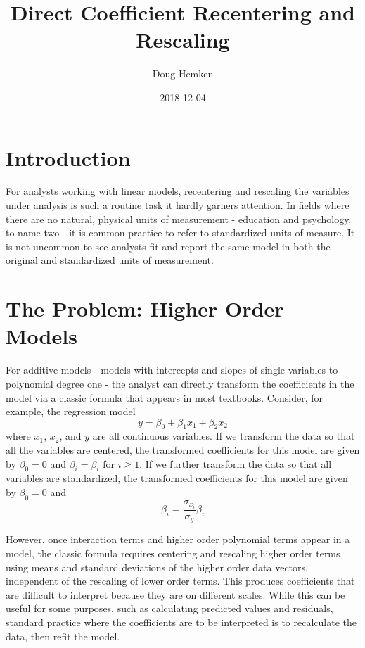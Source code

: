 \documentclass[]{article}
\title{Direct Coefficient Recentering and Rescaling}
\author{Doug Hemken}
\date{2018-12-04}
\begin{document}
\maketitle

{
\setcounter{tocdepth}{2}
\tableofcontents
}
\hypertarget{introduction}{%
\section{Introduction}\label{introduction}}

For analysts working with linear models, recentering and rescaling the
variables under analysis is such a routine task it hardly garners
attention. In fields where there are no natural, physical units of
measurement - education and psychology, to name two - it is common
practice to refer to standardized units of measure. It is not uncommon
to see analysts fit and report the same model in both the original and
standardized units of measurement.

\hypertarget{the-problem-higher-order-models}{%
\section{The Problem: Higher Order
Models}\label{the-problem-higher-order-models}}

For additive models - models with intercepts and slopes of single
variables to polynomial degree one - the analyst can directly transform
the coefficients in the model via a classic formula that appears in most
textbooks. Consider, for example, the regression model
\[y = \beta_0 + \beta_1x_1 + \beta_2x_2\] where \(x_1\), \(x_2\), and
\(y\) are all continuous variables. If we transform the data so that all
the variables are centered, the transformed coefficients for this model
are given by \(\beta_0=0\) and \(\beta_i=\beta_i\) for \(i\ge 1\). If we
further transform the data so that all variables are standardized, the
transformed coefficients for this model are given by \(\beta_0=0\) and
\[\beta_i=\frac{\sigma_{x_i}}{\sigma_y}\beta_i\]

However, once interaction terms and higher order polynomial terms appear
in a model, the classic formula requires centering and rescaling higher
order terms using means and standard deviations of the higher order data
vectors, independent of the rescaling of lower order terms. This
produces coefficients that are difficult to interpret because they are
on different scales. While this can be useful for some purposes, such as
calculating predicted values and residuals, standard practice where the
coefficients are to be interpreted is to recalculate the data, then
refit the model.
\end{document}
